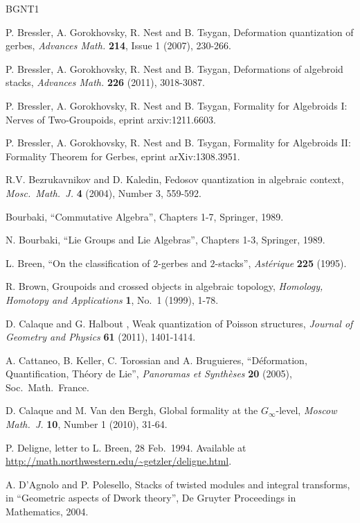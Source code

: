 \documentclass[a4paper, 10pt]{amsart}
\theoremstyle{definition}
\numberwithin{equation}{section}
\begin{document}
\begin{thebibliography}{BGNT1}

 P. Bressler, A. Gorokhovsky, R. Nest and B. Tsygan, 
Deformation quantization of gerbes,
{\em Advances Math.} {\bf 214}, Issue 1 (2007), 230-266.

 P. Bressler, A. Gorokhovsky, R. Nest and B. Tsygan, 
Deformations of algebroid stacks,
{\em Advances Math.}  {\bf 226} (2011), 3018-3087.

 P. Bressler, A. Gorokhovsky, R. Nest and B. Tsygan, 
Formality for Algebroids I: Nerves of Two-Groupoids,
eprint arxiv:1211.6603.

 P. Bressler, A. Gorokhovsky, R. Nest and B. Tsygan, 
Formality for Algebroids II: Formality Theorem for Gerbes,
eprint arXiv:1308.3951. 

 R.V. Bezrukavnikov and D. Kaledin,
	Fedosov quantization in algebraic context,
	{\em Mosc.\ Math.\ J.} {\bf 4} (2004), Number 3,  559-592.
 
 Bourbaki, ``Commutative Algebra'', Chapters 1-7,
	Springer, 1989.

 N. Bourbaki, ``Lie Groups and Lie Algebras'',
  Chapters 1-3, Springer, 1989.

 L. Breen, ``On the classification of $2$-gerbes and
$2$-stacks'', {\em Ast\'erique} {\bf 225} (1995). 

 R. Brown,
  Groupoids and crossed objects in algebraic topology,
  {\em Homology, Homotopy and Applications} {\bf 1}, No.\ 1 (1999), 1-78.

 D. Calaque and G. Halbout ,
   Weak quantization of Poisson structures,
  {\em Journal of Geometry and Physics} {\bf 61} (2011), 1401-1414.

 A. Cattaneo, B. Keller, C. Torossian and
    A. Bruguieres, 
    ``D\'eformation, Quantification, Th\'eory de Lie'',
    {\em Panoramas et Synth\`eses} {\bf 20} (2005), Soc.\ Math.\ France.

 D. Calaque and M. Van den Bergh, 
    Global formality at the $G_\infty$-level,
    {\em Moscow Math.\ J.} {\bf 10}, Number 1 (2010), 31-64.

 P. Deligne, 
letter to L. Breen, 28 Feb.\ 1994. Available at 
\url{http://math.northwestern.edu/~getzler/deligne.html}.

 A. D'Agnolo and P. Polesello,
    Stacks of twisted modules and integral transforms,
    in ``Geometric aspects of Dwork theory'',
    De Gruyter Proceedings in Mathematics, 2004.


\end{thebibliography}
\end{document}
